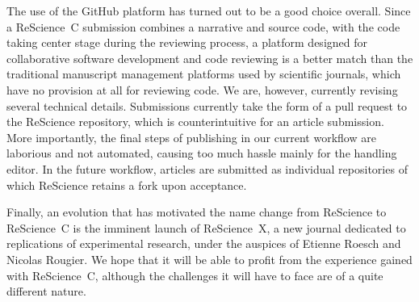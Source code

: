\documentclass[runningheads]{llncs}
\begin{document}
The use of the GitHub platform has turned out to be a good choice overall. Since a ReScience~C submission combines a narrative and source code, with the code taking center stage during the reviewing process, a platform designed for collaborative software development and code reviewing is a better match than the traditional manuscript management platforms used by scientific journals, which have no provision at all for reviewing code. We are, however, currently revising several technical details. Submissions currently take the form of a pull request to the ReScience repository, which is counterintuitive for an article submission. More importantly, the final steps of publishing in our current workflow are laborious and not automated, causing too much hassle mainly for the handling editor. In the future workflow, articles are submitted as individual repositories of which ReScience retains a fork upon acceptance.

Finally, an evolution that has motivated the name change from ReScience to ReScience~C is the imminent launch of ReScience~X, a new journal dedicated to replications of experimental research, under the auspices of Etienne Roesch and Nicolas Rougier. We hope that it will be able to profit from the experience gained with ReScience~C, although the challenges it will have to face are of a quite different nature.

%
%


%
\end{document}
